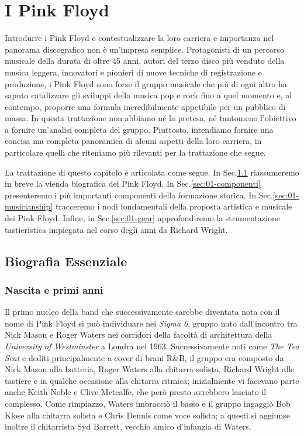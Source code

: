 \documentclass[class=book, crop=false, oneside, 12pt]{standalone}
\begin{document}
    \chapter{I Pink Floyd}
    \label{ch:01-pinkfloyd}
    Introdurre i Pink Floyd e contestualizzare la loro carriera e importanza nel panorama discografico non è un'impresa semplice. Protagonisti di un percorso musicale della durata di oltre 45 anni, autori del terzo disco più venduto della musica leggera, innovatori e pionieri di nuove tecniche di registrazione e produzione, i Pink Floyd sono forse il gruppo musicale che più di ogni altro ha saputo catalizzare gli sviluppi della musica pop e rock fino a quel momento e, al contempo, proporre una formula incredibilmente appetibile per un pubblico di massa. In questa trattazione non abbiamo né la pretesa, né tantomeno l'obiettivo a fornire un'analisi completa del gruppo. Piuttosto, intendiamo fornire una concisa ma completa panoramica di alcuni aspetti della loro carriera, in particolare quelli che riteniamo più rilevanti per la trattazione che segue. 

    La trattazione di questo capitolo è articolata come segue. In Sec.\ref{sec:01-bio} riassumeremo in breve la vienda biografica dei Pink Floyd. In Sec.\ref{sec:01-componenti} presenteremo i più importanti componenti della formazione storica. In Sec.\ref{sec:01-musicianship} tracceremo i nodi fondamentali della proposta artistica e musicale dei Pink Floyd. Infine, in Sec.\ref{sec:01-gear} approfondiremo la strumentazione tastieristica impiegata nel corso degli anni da Richard Wright.

    \section{Biografia Essenziale}\label{sec:01-bio}
    \subsection{Nascita e primi anni}
    Il primo nucleo della band che successivamente sarebbe diventata nota con il nome di Pink Floyd si può individuare nei \emph{Sigma 6}, gruppo nato dall'incontro tra Nick Mason e Roger Waters nei corridori della facoltà di architettura della \emph{University of Westminster} a Londra nel 1963. Successivamente noti come \emph{The Tea Seat} e dediti principalmente a cover di brani R\&B, il gruppo era composto da Nick Mason alla batteria, Roger Waters alla chitarra solista, Richard Wright alle tastiere e in qualche occasione alla chitarra ritmica; inizialmente vi facevano parte anche Keith Noble e Clive Metcalfe, che però presto avrebbero lasciato il complesso. Come rimpiazzo, Waters imbracciò il basso e il gruppo ingaggiò Bob Klose alla chitarra solista e Chris Dennis come voce solista; a questi si aggiunse inoltre il chitarrista Syd Barrett, vecchio amico d'infanzia di Waters.
    
\end{document}
